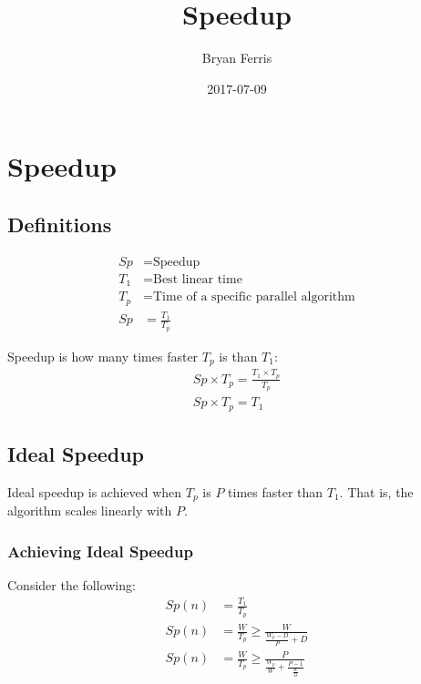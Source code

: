 \documentclass{standalone}
\title{Speedup}
\date{2017-07-09}
\author{Bryan Ferris}
\begin{document}

\section{Speedup}

\subsection{Definitions}
\begin{align*}
	Sp &= \text{Speedup}\\
	T_1 &= \text{Best linear time}\\
	T_p &= \text{Time of a specific parallel algorithm}\\
	Sp &= \frac{T_1}{T_p}
\end{align*}

Speedup is how many times faster $T_p$ is than $T_1$:
\begin{align*}
	Sp \times T_p = \frac{T_1 \times T_p}{T_p}\\
	Sp \times T_p = T_1
\end{align*}

\subsection{Ideal Speedup}
Ideal speedup is achieved when $T_p$ is $P$ times faster than $T_1$. That is, the algorithm scales linearly with $P$.

\subsubsection{Achieving Ideal Speedup}
Consider the following:
\begin{align*}
  Sp(n) &= \frac{T_1}{T_p}\\
  Sp(n) &= \frac{W}{T_p} \geq \frac{W}{\frac{W_p - D}{P} + D}\\
  Sp(n) &= \frac{W}{T_p} \geq \frac{P}{\frac{W_p}{W} + \frac{P - 1}{\frac{W}{D}}}
\end{align*}
\end{document}
